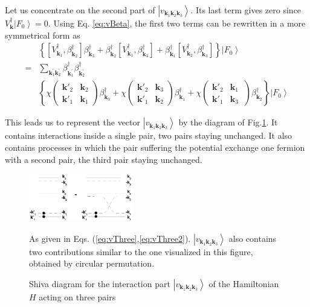 \documentclass[aps,prb,superscriptaddress,showpacs,reprint,lengthcheck]{revtex4-1}
\newcommand{\vk}{\ensuremath{\mathbf{k}}}
\begin{document}
Let us concentrate on the second part of $\left|v_{\mathbf{k} _1\mathbf{k} _2\mathbf{k} _3}\right> $. Its last term gives zero since $V^{\dagger}_\vk\left|F_0\right>  =0$. Using
Eq. \eqref{eq:vBeta}, the first two terms  can be
rewritten in a more symmetrical form as 
\begin{equation}  \label{eq:vThree2}
\begin{split}
&\left\{\left[V^{\dagger}_{\mathbf{k} _1},\beta^{\dagger}_{\mathbf{k} _2}%
\right]  \beta^{\dagger}_{\mathbf{k} _3}+\beta^{\dagger}_{\mathbf{k} _2}%
\left[V^{\dagger}_{\mathbf{k} _1},\beta^{\dagger}_{\mathbf{k} _3}\right] 
+\beta^{\dagger}_{\mathbf{k} _1}\left[V^{\dagger}_{\mathbf{k}
_2},\beta^{\dagger}_{\mathbf{k} _3}\right]  \right\} \left|F_0\right>   \\
=&\sum_{\vk^{\prime}_1\mathbf{k} ^{\prime}_2}\beta^{\dagger}_{\mathbf{k}
^{\prime}_1}\beta^{\dagger}_{\mathbf{k} ^{\prime}_2} \\
&\left\{\chi\left(\begin{smallmatrix}\vk'_2&\vk_2\\\vk'_1&\vk_1%
\end{smallmatrix}\right)  \beta^{\dagger}_{\mathbf{k} _3}+\chi\left(%
\begin{smallmatrix}\vk'_2&\vk_3\\\vk'_1&\vk_2\end{smallmatrix}\right) 
\beta^{\dagger}_{\mathbf{k} _1}+\chi\left(\begin{smallmatrix}\vk'_2&\vk_1\
\\\vk'_1&\vk_3\end{smallmatrix}\right)  \beta^{\dagger}_{\mathbf{k}
_2}\right\} \left|F_0\right>  
\end{split}%
\end{equation}

This leads us to represent the vector $\left|v_{\mathbf{k} _1\mathbf{k} _2%
\mathbf{k} _3}\right> $ by the diagram of Fig.\ref{fig:threeP}. It contains interactions inside a single pair, two pairs
staying unchanged. It also contains processes in which the pair suffering the potential exchange one fermion with a
second pair, the third pair staying unchanged. 
\begin{figure}[htb]
   \includegraphics[width=0.4\textwidth]{threePair.eps}
\caption{Shiva diagram for the interaction part $\left|v_{\mathbf{k} _1\mathbf{k} _2%
\mathbf{k} _3}\right> $ of the Hamiltonian $H$ acting on three pairs }\label{fig:threeP}
 
\begin{flushleft}
 \normalsize	As given in Eqs. (\ref{eq:vThree},\ref{eq:vThree2}). $\left|v_{\mathbf{k} _1\mathbf{k} _2%
\mathbf{k} _3}\right> $ also contains two  contributions similar to the one
visualized in this figure, obtained by circular permutation.
\end{flushleft}
\end{figure}
\end{document}
